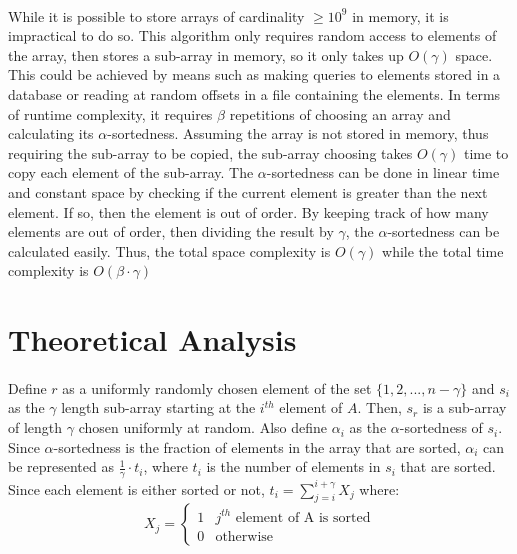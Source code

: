 \documentclass{article}
\begin{document}
\paragraph{}While it is possible to store arrays of cardinality $\geq 10^{9}$ in memory, it is impractical to do so.
 This algorithm only requires random access to elements of the array, then stores a sub-array in memory, so it only takes up $O(\gamma)$ space.
This could be achieved by means such as making queries to elements stored in a database or reading at random offsets in a file containing the elements.
In terms of runtime complexity, it requires $\beta$ repetitions of choosing an array and calculating its $\alpha$-sortedness.
 Assuming the array is not stored in memory, thus requiring the sub-array to be copied, the sub-array choosing takes $O(\gamma)$ time to copy each element of the sub-array.
The $\alpha$-sortedness can be done in linear time and constant space by checking if the current element is greater than the next element.
 If so, then the element is out of order.
 By keeping track of how many elements are out of order, then dividing the result by $\gamma$, the $\alpha$-sortedness can be calculated easily.
Thus, the total space complexity is $O(\gamma)$ while the total time complexity is $O(\beta \cdot \gamma)$
\section{Theoretical Analysis}
\paragraph{}Define $r$ as a uniformly randomly chosen element of the set $\{1, 2, ..., n - \gamma\}$ and $s_{i}$ as the $\gamma$ length sub-array starting at the $i^{th}$ element of $A$.
 Then, $s_{r}$ is a sub-array of length $\gamma$ chosen uniformly at random.
 Also define $\alpha_{i}$ as the $\alpha$-sortedness of $s_{i}$.
Since $\alpha$-sortedness is the fraction of elements in the array that are sorted, $\alpha_{i}$ can be represented as $\frac{1}{\gamma} \cdot t_{i}$, where $t_{i}$ is the number of elements in $s_{i}$ that are sorted.
 Since each element is either sorted or not, $t_{i} = \sum_{j=i}^{i+\gamma}X_{j}$ where:
\[ 
X_{j} =
\begin{cases}
	1 & j^{th}\text{ element of A is sorted} \\
	0 & \text{otherwise}
\end{cases} \]
\end{document}

